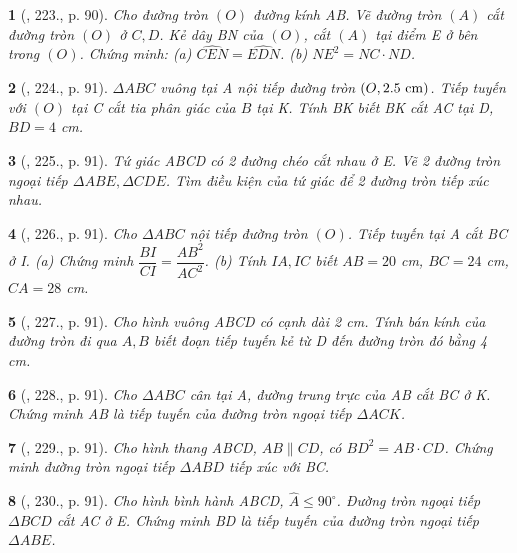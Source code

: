 \documentclass{article}
\newtheorem{baitoan}{}
\begin{document}
\begin{baitoan}[\cite{Binh_Toan_9_tap_2}, 223., p. 90]
	Cho đường tròn $(O)$ đường kính AB. Vẽ đường tròn $(A)$ cắt đường tròn $(O)$ ở $C,D$. Kẻ dây BN của $(O)$, cắt $(A)$ tại điểm E ở bên trong $(O)$. Chứng minh: (a) $\widehat{CEN} = \widehat{EDN}$. (b) $NE^2 = NC\cdot ND$.
\end{baitoan}

\begin{baitoan}[\cite{Binh_Toan_9_tap_2}, 224., p. 91]
	$\Delta ABC$ vuông tại A nội tiếp đường tròn $(O,2.5\ {\rm cm})$. Tiếp tuyến với $(O)$ tại C cắt tia phân giác của $\widehat{B}$ tại K. Tính BK biết BK cắt AC tại D, $BD = 4$ {\rm cm}.
\end{baitoan}

\begin{baitoan}[\cite{Binh_Toan_9_tap_2}, 225., p. 91]
	Tứ giác ABCD có 2 đường chéo cắt nhau ở E. Vẽ 2 đường tròn ngoại tiếp $\Delta ABE,\Delta CDE$. Tìm điều kiện của tứ giác để 2 đường tròn tiếp xúc nhau.
\end{baitoan}

\begin{baitoan}[\cite{Binh_Toan_9_tap_2}, 226., p. 91]
	Cho $\Delta ABC$ nội tiếp đường tròn $(O)$. Tiếp tuyến tại A cắt BC ở I. (a) Chứng minh $\dfrac{BI}{CI} = \dfrac{AB^2}{AC^2}$. (b) Tính $IA,IC$ biết $AB = 20$ {\rm cm}, $BC = 24$ {\rm cm}, $CA = 28$ {\rm cm}.
\end{baitoan}

\begin{baitoan}[\cite{Binh_Toan_9_tap_2}, 227., p. 91]
	Cho hình vuông ABCD có cạnh dài {\rm2 cm}. Tính bán kính của đường tròn đi qua $A,B$ biết đoạn tiếp tuyến kẻ từ D đến đường tròn đó bằng {\rm4 cm}.
\end{baitoan}

\begin{baitoan}[\cite{Binh_Toan_9_tap_2}, 228., p. 91]
	Cho $\Delta ABC$ cân tại A, đường trung trực của AB cắt BC ở K. Chứng minh AB là tiếp tuyến của đường tròn ngoại tiếp $\Delta ACK$.
\end{baitoan}

\begin{baitoan}[\cite{Binh_Toan_9_tap_2}, 229., p. 91]
	Cho hình thang ABCD, $AB\parallel CD$, có $BD^2 = AB\cdot CD$. Chứng minh đường tròn ngoại tiếp $\Delta ABD$ tiếp xúc với BC.
\end{baitoan}

\begin{baitoan}[\cite{Binh_Toan_9_tap_2}, 230., p. 91]
	Cho hình bình hành ABCD, $\widehat{A}\le90^\circ$. Đường tròn ngoại tiếp $\Delta BCD$ cắt AC ở E. Chứng minh BD là tiếp tuyến của đường tròn ngoại tiếp $\Delta ABE$.
\end{baitoan}
\end{document}
